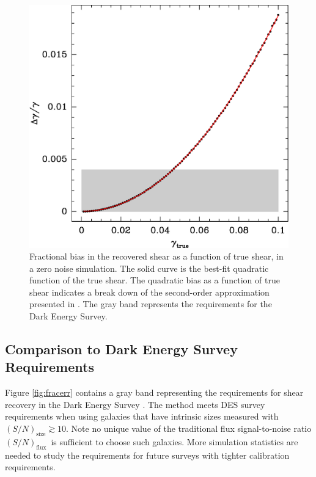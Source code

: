 \documentclass[12pt,preprint]{aastex}
\newcommand{\Tsn}{$(S/N)_{\textrm{size}}$}
\newcommand{\fsn}{$(S/N)_{\textrm{flux}}$}
\begin{document}
\begin{figure}[t] \centering
 \centering 
 \includegraphics[scale=0.6]{figures/fracerr-vs-shear.eps}

 \caption{Fractional bias in the recovered shear as a function of true shear,
     in a zero noise simulation.  The solid curve is the best-fit quadratic
     function of the true shear.  The quadratic bias as a function of true
     shear indicates a break down of the second-order approximation presented
     in \cite{ba13}. The gray band represents the requirements for the Dark
 Energy Survey. \label{fig:nonoise}}

\end{figure}

\subsection{Comparison to Dark Energy Survey Requirements} \label{sec:desreq}

Figure \ref{fig:fracerr} contains a gray band representing the requirements for
shear recovery in the Dark Energy Survey \citep[][DES]{DESWhitePaper}.  The
method meets DES survey requirements when using galaxies that have intrinsic
sizes measured with \Tsn$ \gtrsim 10$.  Note no unique value of the traditional
flux signal-to-noise ratio \fsn\ is sufficient to choose such galaxies.  More
simulation statistics are needed to study the requirements for future surveys
with tighter calibration requirements.
\end{document}
